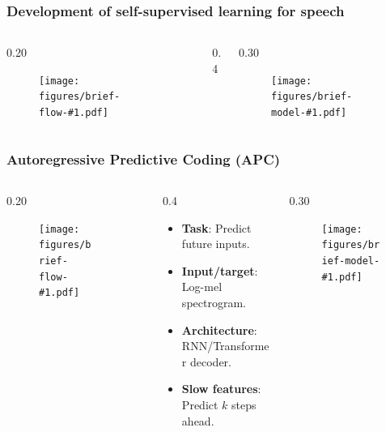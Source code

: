 \newcommand{\presentationbriefslide}[3]{%
    \begin{frame}
        \frametitle{#2}
        \begin{columns}[t]
            \hspace{0.025\textwidth}
            \begin{column}{0.20\textwidth}
                \begin{figure}[\textwidth]
                    \centering
                    \texttt{[image: figures/brief-flow-\#1.pdf]}
                \end{figure}
            \end{column}
            {\textcolor{black!40}{\vrule{}}}
            \begin{column}{0.4\textwidth}
                {\vspace{0.1\textheight}#3}
            \end{column}
            \begin{column}{0.30\textwidth}
                \begin{figure}[\textwidth]
                    \centering
                    \texttt{[image: figures/brief-model-\#1.pdf]}
                \end{figure}
            \end{column}
            \hspace{0.020\textwidth}
        \end{columns}
    \end{frame}
}

\presentationbriefslide{0}{Development of self-supervised learning for speech}{%
}

\presentationbriefslide{1}{Autoregressive Predictive Coding (APC)}{%
    \begin{itemize}
        \item {\bfseries \color{black} Task}: Predict future inputs.
        \item {\bfseries \color{black} Input/target}: Log-mel spectrogram.
        \item {\bfseries \color{black} Architecture}: RNN/Transformer decoder.
        \item {\bfseries \color{black} Slow features}: Predict $k$ steps ahead.
    \end{itemize}
}

